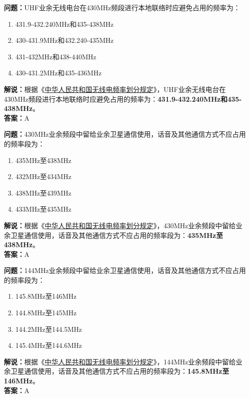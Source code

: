 \textbf{问题：}UHF业余无线电台在430MHz频段进行本地联络时应避免占用的频率为：
\begin{enumerate}[label=\Alph*), leftmargin=1cm]
  \item 431.9-432.240MHz和435-438MHz
  \item 430-431.9MHz和432.240-435MHz
  \item 431-432MHz和438-440MHz
  \item 430-431.2MHz和435-436MHz
\end{enumerate}
\textbf{解说：}根据《\href{https://www.miit.gov.cn/zwgk/zcwj/wjfb/txy/art/2020/art_066386284cd2449493586c81ccafed11.html}{中华人民共和国无线电频率划分规定}》，UHF业余无线电台在430MHz频段进行本地联络时应避免占用的频率为：\textbf{431.9-432.240MHz和435-438MHz}。\\\textbf{答案：}A%

\textbf{问题：}430MHz业余频段中留给业余卫星通信使用，话音及其他通信方式不应占用的频率段为：
\begin{enumerate}[label=\Alph*), leftmargin=1cm]
  \item 435MHz至438MHz
  \item 432MHz至434MHz
  \item 438MHz至439MHz
  \item 433MHz至435MHz
\end{enumerate}
\textbf{解说：}根据《\href{https://www.miit.gov.cn/zwgk/zcwj/wjfb/txy/art/2020/art_066386284cd2449493586c81ccafed11.html}{中华人民共和国无线电频率划分规定}》，430MHz业余频段中留给业余卫星通信使用，话音及其他通信方式不应占用的频率段为：\textbf{435MHz至438MHz}。\\\textbf{答案：}A

\textbf{问题：}144MHz业余频段中留给业余卫星通信使用，话音及其他通信方式不应占用的频率段为：
\begin{enumerate}[label=\Alph*), leftmargin=1cm]
  \item 145.8MHz至146MHz
  \item 144.8MHz至145MHz
  \item 144.2MHz至144.5MHz
  \item 145.4MHz至144.6MHz
\end{enumerate}
\textbf{解说：}根据《\href{https://www.miit.gov.cn/zwgk/zcwj/wjfb/txy/art/2020/art_066386284cd2449493586c81ccafed11.html}{中华人民共和国无线电频率划分规定}》，144MHz业余频段中留给业余卫星通信使用，话音及其他通信方式不应占用的频率段为：\textbf{145.8MHz至146MHz}。\\\textbf{答案：}A%

